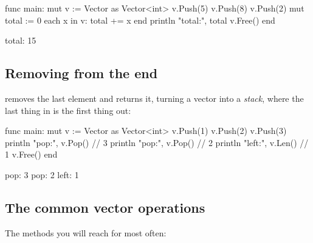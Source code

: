 \begin{salamen}
func main:
    mut v := Vector {} as Vector<int>
    v.Push(5)
    v.Push(8)
    v.Push(2)
    mut total := 0
    each x in v:
        total += x
    end
    println "total:", total
    v.Free()
end
\end{salamen}

\begin{progout}
total: 15
\end{progout}

\subsection{Removing from the end}

 removes the last element and returns it, turning a vector into a
\emph{stack}, where the last thing in is the first thing out:

\begin{salamen}
func main:
    mut v := Vector {} as Vector<int>
    v.Push(1)
    v.Push(2)
    v.Push(3)
    println "pop:", v.Pop()      // 3
    println "pop:", v.Pop()      // 2
    println "left:", v.Len()     // 1
    v.Free()
end
\end{salamen}

\begin{progout}
pop: 3
pop: 2
left: 1
\end{progout}

\subsection{The common vector operations}

The methods you will reach for most often:


